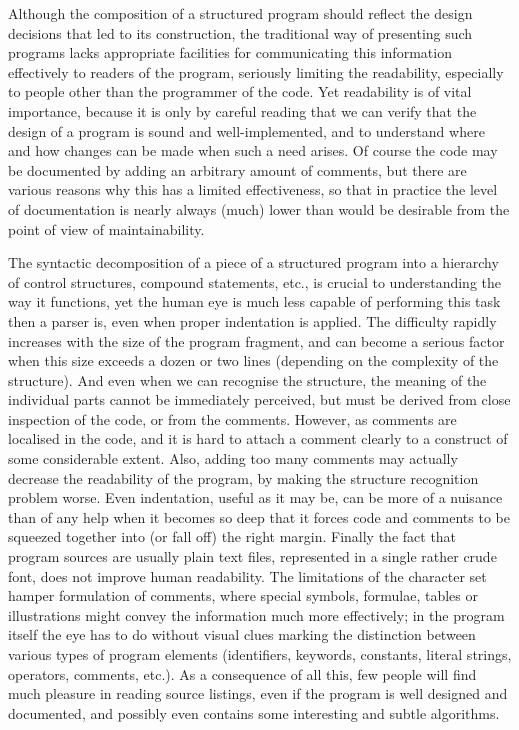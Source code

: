 Although the composition of a structured program should reflect the design
decisions that led to its construction, the traditional way of presenting
such programs lacks appropriate facilities for communicating this
information effectively to readers of the program, seriously limiting the
readability, especially to people other than the programmer of the code. Yet
readability is of vital importance, because it is only by careful reading
that we can verify that the design of a program is sound and
well-implemented, and to understand where and how changes can be made when
such a need arises. Of course the code may be documented by adding an
arbitrary amount of comments, but there are various reasons why this has a
limited effectiveness, so that in practice the level of documentation is
nearly always (much) lower than would be desirable from the point of view of
maintainability.

The syntactic decomposition of a piece of a structured program into a
hierarchy of control structures, compound statements, etc., is crucial to
understanding the way it functions, yet the human eye is much less capable
of performing this task then a parser is, even when proper indentation is
applied. The difficulty rapidly increases with the size of the program
fragment, and can become a serious factor when this size exceeds a dozen or
two lines (depending on the complexity of the structure). And even when we
can recognise the structure, the meaning of the individual parts cannot be
immediately perceived, but must be derived from close inspection of the
code, or from the comments. However, as comments are localised in the code,
and it is hard to attach a comment clearly to a construct of some
considerable extent. Also, adding too many comments may actually decrease the
readability of the program, by making the structure recognition problem
worse. Even indentation, useful as it may be, can be more of a nuisance than
of any help when it becomes so deep that it forces code and comments to be
squeezed together into (or fall off) the right margin. Finally the fact that
program sources are usually plain text files, represented in a single rather
crude font, does not improve human readability. The limitations of the
character set hamper formulation of comments, where special symbols,
formulae, tables or illustrations might convey the information much more
effectively; in the program itself the eye has to do without visual clues
marking the distinction between various types of program elements
(identifiers, keywords, constants, literal strings, operators, comments,
etc.). As a consequence of all this, few people will find much pleasure in
reading source listings, even if the program is well designed and
documented, and possibly even contains some interesting and subtle
algorithms.

